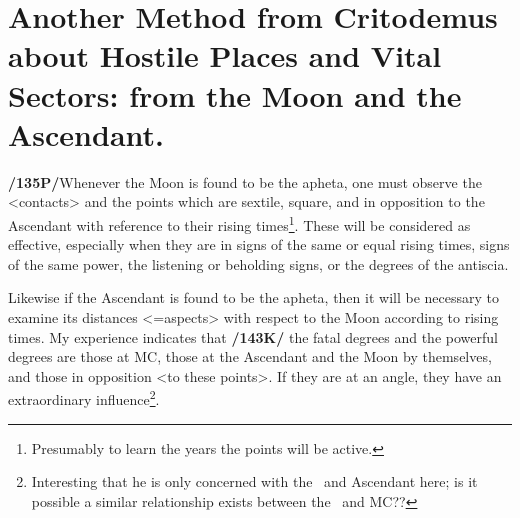 \section{Another Method from Critodemus about Hostile Places and Vital Sectors: from the Moon and the Ascendant.}

\textbf{/135P/}Whenever the Moon is found to be the apheta, one must observe the <contacts> and the points which are sextile, square, and in opposition to the Ascendant with reference to their rising times\footnote{Presumably to learn the years the points will be active.}. These will be considered as effective, especially when they are in signs of the same or equal rising times, signs of the same power, the listening or beholding signs, or the degrees of the antiscia. 

Likewise if the Ascendant is found to be the apheta, then it will be necessary to examine its distances <=aspects> with respect to the Moon according to rising times. My experience indicates that \textbf{/143K/} the fatal degrees and the powerful degrees are those at MC, those at the Ascendant and the Moon by themselves, and those in opposition <to these points>. If they are at an angle, they have an extraordinary influence\footnote{Interesting that he is only concerned with the \Moon\, and Ascendant here; is it possible a similar relationship exists between the \Sun\, and MC??}.

\newpage